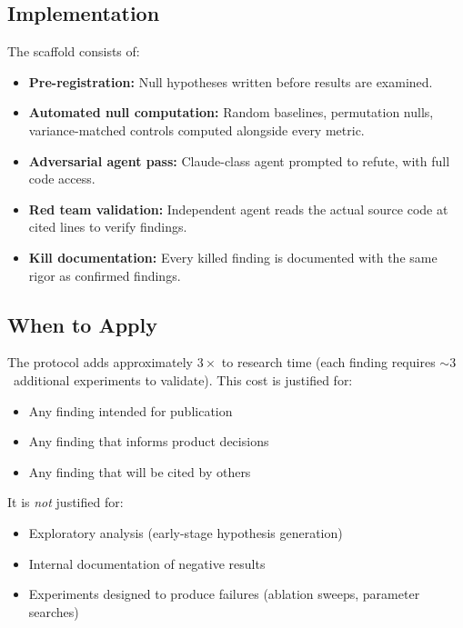 \documentclass[11pt,a4paper]{article}
\begin{document}
\subsection{Implementation}

The scaffold consists of:
\begin{itemize}[nosep]
    \item \textbf{Pre-registration:} Null hypotheses written before
          results are examined.
    \item \textbf{Automated null computation:} Random baselines,
          permutation nulls, variance-matched controls computed alongside
          every metric.
    \item \textbf{Adversarial agent pass:} Claude-class agent prompted to
          refute, with full code access.
    \item \textbf{Red team validation:} Independent agent reads the actual
          source code at cited lines to verify findings.
    \item \textbf{Kill documentation:} Every killed finding is documented
          with the same rigor as confirmed findings.
\end{itemize}

\subsection{When to Apply}

The protocol adds approximately $3\times$ to research time (each finding
requires ${\sim}3$~additional experiments to validate). This cost is
justified for:
\begin{itemize}[nosep]
    \item Any finding intended for publication
    \item Any finding that informs product decisions
    \item Any finding that will be cited by others
\end{itemize}

It is \emph{not} justified for:
\begin{itemize}[nosep]
    \item Exploratory analysis (early-stage hypothesis generation)
    \item Internal documentation of negative results
    \item Experiments designed to produce failures (ablation sweeps,
          parameter searches)
\end{itemize}

\end{document}
